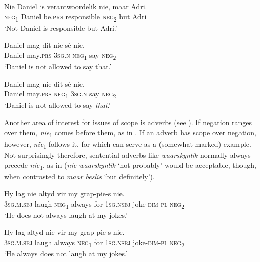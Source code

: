 \documentclass[output=paper,colorlinks,citecolor=brown]{langscibook}
\begin{document}
    \ex\label{ex:afr:34c}
        \gll Nie Daniel is verantwoordelik nie, maar Adri. \\ 
             \textsc{neg}\textsubscript{1} Daniel be.\textsc{prs} responsible \textsc{neg}\textsubscript{2} but Adri \\
        \glt ‘Not Daniel is responsible but Adri.’
    
    \ex\label{ex:afr:34d}
        \gll Daniel mag dit nie sê nie. \\
             Daniel  may.\textsc{prs} \textsc{3sg.n} \textsc{neg}\textsubscript{1} say  \textsc{neg}\textsubscript{2}\\
        \glt ‘Daniel is not allowed to say that.’

    \ex\label{ex:afr:34e}
        \gll Daniel mag nie dit sê nie. \\
             Daniel may.\textsc{prs} \textsc{neg}\textsubscript{1} \textsc{3sg.n} say  \textsc{neg}\textsubscript{2}\\
        \glt ‘Daniel is not allowed to say \textit{that}.’
    \z
\z 

Another area of interest for issues of scope is adverbs (see \citealt[122--124]{Biberauer2008}). If negation ranges over them, \textit{nie}\textsubscript{1} comes before them, as in . If an adverb has scope over negation, however, \textit{nie}\textsubscript{1} follows it, for which  can serve as a (somewhat marked) example. Not surprisingly therefore, sentential adverbs like \textit{waarskynlik} normally always precede \textit{nie}\textsubscript{1}, as in  (\textit{nie waarskynlik} ‘not probably’ would be acceptable, though, when contrasted to \textit{maar beslis} ‘but definitely’).


\ea\label{ex:afr:35}
    \ea\label{ex:afr:35a}
        \gll Hy lag nie altyd vir my grap-pie-s nie. \\ 
             \textsc{3sg.m.sbj} laugh \textsc{neg}\textsubscript{1} always for \textsc{1sg.nsbj} joke-\textsc{dim-pl} \textsc{neg}\textsubscript{2}
 \\
        \glt ‘He does not always laugh at my jokes.’
    
    \ex\label{ex:afr:35b}
        \gll Hy lag altyd nie vir my grap-pie-s nie. \\
             \textsc{3sg.m.sbj} laugh always \textsc{neg}\textsubscript{1} for \textsc{1sg.nsbj} joke-\textsc{dim-pl} \textsc{neg}\textsubscript{2} \\
        \glt ‘He always does not laugh at my jokes.’
   
\end{document}
